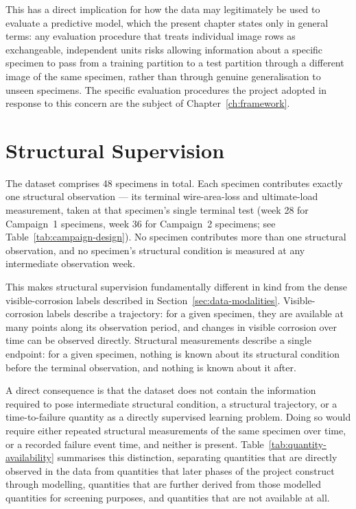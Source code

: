 This has a direct implication for how the data may legitimately be used
to evaluate a predictive model, which the present chapter states only in
general terms: any evaluation procedure that treats individual image rows
as exchangeable, independent units risks allowing information about a
specific specimen to pass from a training partition to a test partition
through a different image of the same specimen, rather than through
genuine generalisation to unseen specimens. The specific evaluation
procedures the project adopted in response to this concern are the subject
of Chapter~\ref{ch:framework}.

\section{Structural Supervision}
\label{sec:structural-supervision}

The dataset comprises 48 specimens in total. Each specimen contributes
exactly one structural observation — its terminal wire-area-loss and
ultimate-load measurement, taken at that specimen's single terminal test
(week 28 for Campaign~1 specimens, week 36 for Campaign~2 specimens; see
Table~\ref{tab:campaign-design}). No specimen contributes more than one
structural observation, and no specimen's structural condition is measured
at any intermediate observation week.

This makes structural supervision fundamentally different in kind from the
dense visible-corrosion labels described in
Section~\ref{sec:data-modalities}. Visible-corrosion labels describe a
trajectory: for a given specimen, they are available at many points along
its observation period, and changes in visible corrosion over time can be
observed directly. Structural measurements describe a single endpoint:
for a given specimen, nothing is known about its structural condition
before the terminal observation, and nothing is known about it after.

A direct consequence is that the dataset does not contain the information
required to pose intermediate structural condition, a structural
trajectory, or a time-to-failure quantity as a directly supervised
learning problem. Doing so would require either repeated structural
measurements of the same specimen over time, or a recorded failure event
time, and neither is present. Table~\ref{tab:quantity-availability}
summarises this distinction, separating quantities that are directly
observed in the data from quantities that later phases of the project
construct through modelling, quantities that are further derived from
those modelled quantities for screening purposes, and quantities that are
not available at all.

